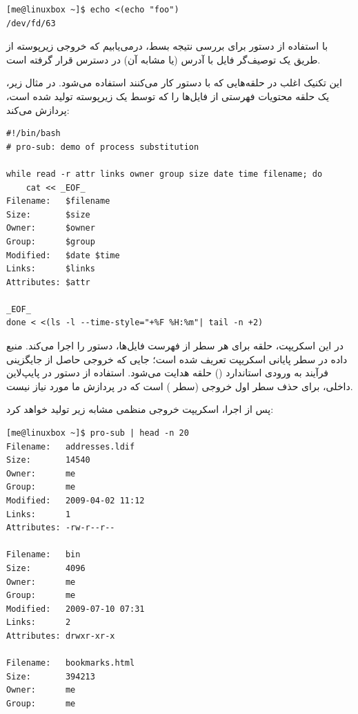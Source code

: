 \begin{latin}
\begin{lstlisting}
[me@linuxbox ~]$ echo <(echo "foo")
/dev/fd/63
\end{lstlisting}
\end{latin}

با استفاده از دستور  برای بررسی نتیجه بسط، درمی‌یابیم که خروجی زیرپوسته از طریق یک توصیف‌گر فایل با آدرس  (یا مشابه آن) در دسترس قرار گرفته است.

این تکنیک اغلب در حلقه‌هایی که با دستور  کار می‌کنند استفاده می‌شود. در مثال زیر، یک حلقه  محتویات فهرستی از فایل‌ها را که توسط یک زیرپوسته تولید شده است، پردازش می‌کند:

\begin{latin}
\begin{lstlisting}
#!/bin/bash
# pro-sub: demo of process substitution

while read -r attr links owner group size date time filename; do
    cat << _EOF_
Filename:   $filename
Size:       $size
Owner:      $owner
Group:      $group
Modified:   $date $time
Links:      $links
Attributes: $attr

_EOF_
done < <(ls -l --time-style="+%F %H:%m"| tail -n +2)
\end{lstlisting}
\end{latin}

در این اسکریپت، حلقه برای هر سطر از فهرست فایل‌ها، دستور  را اجرا می‌کند. منبع داده در سطر پایانی اسکریپت تعریف شده است؛ جایی که خروجی حاصل از جایگزینی فرآیند به ورودی استاندارد () حلقه هدایت می‌شود. استفاده از دستور  در پایپ‌لاین داخلی، برای حذف سطر اول خروجی  (سطر ) است که در پردازش ما مورد نیاز نیست.

پس از اجرا، اسکریپت خروجی منظمی مشابه زیر تولید خواهد کرد:

\begin{latin}
\begin{lstlisting}
[me@linuxbox ~]$ pro-sub | head -n 20
Filename:   addresses.ldif
Size:       14540
Owner:      me
Group:      me
Modified:   2009-04-02 11:12
Links:      1
Attributes: -rw-r--r--

Filename:   bin
Size:       4096
Owner:      me
Group:      me
Modified:   2009-07-10 07:31
Links:      2
Attributes: drwxr-xr-x

Filename:   bookmarks.html
Size:       394213
Owner:      me
Group:      me
\end{lstlisting}
\end{latin}


